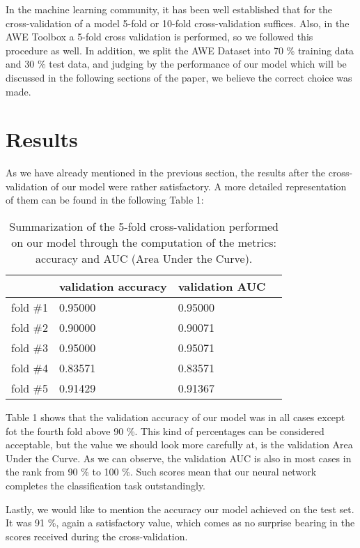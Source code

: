 \documentclass[9pt]{IEEEtran}
\begin{document}
In the machine learning community, it has been well established that for the cross-validation of a model 5-fold or 10-fold cross-validation suffices. Also, in the AWE Toolbox a 5-fold cross validation is performed, so we followed this procedure as well. In addition, we split the AWE Dataset into 70 \% training data and 30 \% test data, and judging by the performance of our model which will be discussed in the following sections of the paper, we believe the correct choice was made.

\section{Results}
As we have already mentioned in the previous section, the results after the cross-validation of our model were rather satisfactory. A more detailed representation of them can be found in the following Table 1:

\begin{table}[h!]
\caption{Summarization of the 5-fold cross-validation performed on our model through the computation of the metrics: accuracy and AUC (Area Under the Curve).}
\centering
\begin{tabular}{llll}
\hline
                  & validation accuracy & validation AUC    \\
\hline
fold \#1              & 0.95000   & 0.95000  \\
\hline
fold \#2             & 0.90000     & 0.90071 \\
\hline
fold \#3             & 0.95000   & 0.95071 \\
\hline
fold \#4            & 0.83571  & 0.83571 \\
\hline
fold \#5           & 0.91429   & 0.91367  \\
\hline
\end{tabular}
\end{table}

Table 1 shows that the validation accuracy of our model was in all cases except fot the fourth fold above 90 \%. This kind of percentages can be considered acceptable, but the value we should look more carefully at, is the validation Area Under the Curve. As we can observe, the validation AUC is also in most cases in the rank from 90 \% to 100 \%. Such scores mean that our neural network completes the classification task outstandingly.

Lastly, we would like to mention the accuracy our model achieved on the test set. It was 91 \%, again a satisfactory value, which comes as no surprise bearing in the scores received during the cross-validation.
\end{document}
